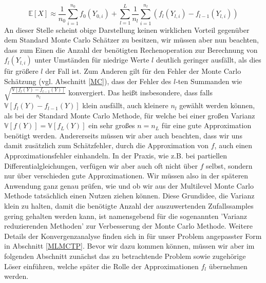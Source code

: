 \[
 \mathbb{E}[X] \approx \frac{1}{n_0} \sum_{i=1}^{n_0}f_0(Y_{0,i}) + \sum_{l=1}^{L} \frac{1}{n_l}\sum_{i=1}^{n_l} \left( f_l(Y_{l,i}) - f_{l-1}(Y_{l,i})\right)
\]
An dieser Stelle scheint obige Darstellung keinen wirklichen Vorteil gegenüber dem Standard Monte Carlo Schätzer zu besitzen, wir müssen aber nun beachten, dass zum Einen die Anzahl der benötigten Rechenoperation zur Berechnung von $ f_l(Y_{l,i}) $ unter Umständen für niedrige Werte $ l $ deutlich geringer ausfällt, als dies für größere $ l $ der Fall ist.
Zum Anderen gilt für den Fehler der Monte Carlo Schätzung (vgl. Abschnitt \ref{MC}), dass der Fehler des $l$-ten Summanden wie $ \sqrt{\frac{\mathbb{V}[f_l(Y) - f_{l-1}(Y)]}{n_l}} $ konvergiert. Das heißt insbesondere, dass falls $ \mathbb{V}[f_l(Y)-f_{l-1}(Y)] $ klein ausfällt, auch kleinere $ n_l $ gewählt werden können, als bei der Standard Monte Carlo Methode, für welche bei einer großen Varianz $ \mathbb{V}[f(Y)] = \mathbb{V}[f_L(Y)] $ ein sehr großes $ n=n_L $ für eine gute Approximation benötigt werden. Andererseits müssen wir aber auch beachten, dass wir uns damit zusätzlich zum Schätzfehler, durch die Approximation von $ f $, auch einen Approximationsfehler einhandeln. In der Praxis, wie z.B. bei partiellen Differentialgleichungen, verfügen wir aber auch oft nicht über $ f $ selbst, sondern nur über verschieden gute Approximationen. Wir müssen also in der späteren Anwendung ganz genau prüfen, wie und ob wir aus der Multilevel Monte Carlo Methode tatsächlich einen Nutzen ziehen können. Diese Grundidee, die Varianz klein zu halten, damit die benötigte Anzahl der auszuwertenden Zufallssamples gering gehalten werden kann, ist namensgebend für die sogenannten 'Varianz reduzierenden Methoden' zur Verbesserung der Monte Carlo Methode. Weitere Details der Konvergenzanalyse finden sich in für unser Problem angepasster Form in Abschnitt \ref{MLMCTP}.
Bevor wir dazu kommen können, müssen wir aber im folgenden Abschnitt zunächst das zu betrachtende Problem sowie zugehörige Löser einführen, welche später die Rolle der Approximationen $ f_l $ übernehmen werden.
